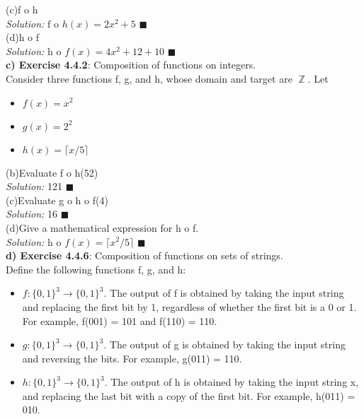 \documentclass[11pt]{article}
\DeclareMathOperator*{\Z}{\mathbb{Z}}\relax
\begin{document}
		(c)f o h \\
		\textit{Solution: }
		$\text{f o }h(x) = 2x^2 + 5$ $\blacksquare$ \\
		
		(d)h o f \\ 
		\textit{Solution: }
		$\text{h o }f(x) = 4x^2+12+10$ $\blacksquare$ \\		
		
	\newpage
		\textbf{c) Exercise 4.4.2}: Composition of functions on integers. \\
		Consider three functions f, g, and h, whose domain and target are $\Z$. Let	
		\begin{itemize}
			\item $f(x) = x^2$
			\item $g(x) = 2^2$
			\item $h(x) = \lceil x/5 \rceil$
		\end{itemize}
		
		(b)Evaluate f o h(52)	\\
		\textit{Solution: } 121 $\blacksquare$ \\
		
		
		(c)Evaluate g o h o f(4) \\
		\textit{Solution: } 16 $\blacksquare$ \\
		
		(d)Give a mathematical expression for h o f. \\
		\textit{Solution: }
		$\text{h o }f(x) = \lceil x^2/5 \rceil$ $\blacksquare$ \\
		
		\textbf{d) Exercise 4.4.6}: Composition of functions on sets of strings. \\
		Define the following functions f, g, and h:
		\begin{itemize}
			\item $f: \{0, 1\}^3 \rightarrow \{0, 1\}^3$. The output of f is obtained by taking the input string and replacing the first bit by 1, 
			regardless of whether the first bit is a 0 or 1. For example, f(001) = 101 and f(110) = 110.
			\item $g: \{0, 1\}^3 \rightarrow \{0, 1\}^3$. The output of g is obtained by taking the input string and reversing the bits. For example, g(011) = 110.
			\item $h: \{0, 1\}^3 \rightarrow \{0, 1\}^3$. The output of h is obtained by taking the input string x, 
			and replacing the last bit with a copy of the first bit. For example, h(011) = 010.
		\end{itemize}		
		
\end{document}
